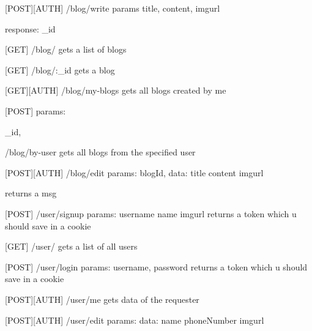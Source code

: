 [POST][AUTH] /blog/write
params{
	title,
content,
imgurl
}

response: _id

[GET]
/blog/
gets a list of blogs

[GET]
/blog/:_id
gets a blog

[GET][AUTH]
/blog/my-blogs
gets all blogs created by me 

[POST]
params: {
	_id,

}
/blog/by-user
gets all blogs from the specified user

[POST][AUTH]
/blog/edit
params: {
	blogId,
	data: {
	title
content
imgurl
}
}

returns a msg

[POST]
/user/signup
params: {
username
name
imgurl
}
returns a token which u should save in a cookie

[GET]
/user/
gets a list of all users

[POST]
/user/login
params: {
	username,
password
}
returns a token which u should save in a cookie

[POST][AUTH]
/user/me
gets data of the requester

[POST][AUTH]
/user/edit
params: {
	data: {
	name
phoneNumber
imgurl
}
}

